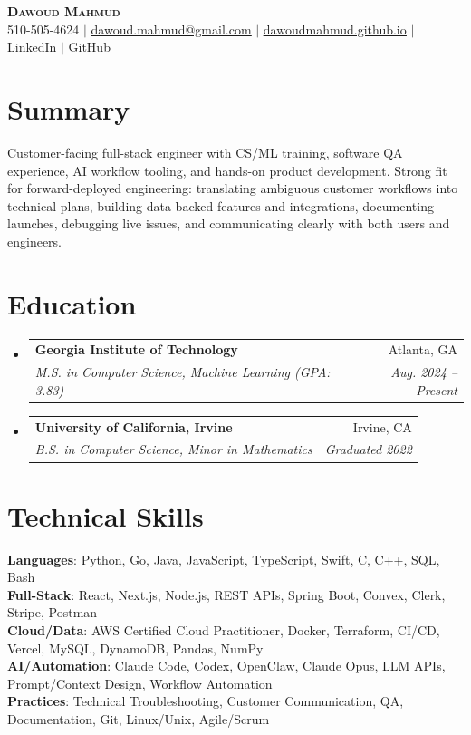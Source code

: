 \documentclass[letterpaper,11pt]{article}
\makeatletter
\newcommand{\resumeSubheading}[4]{
 \vspace{-1pt}\item
 \begin{tabular*}{0.97\textwidth}[t]{l@{\extracolsep{\fill}}r}
 \textbf{#1} & #2 \\
 \textit{\small#3} & \textit{\small #4} \\
 \end{tabular*}\vspace{-6pt}
}
\newcommand{\resumeSubHeadingListStart}{\begin{itemize}[leftmargin=0.15in, label={}]}
\newcommand{\resumeSubHeadingListEnd}{\end{itemize}}
\makeatother
\begin{document}
\begin{center}
 \textbf{\Huge \scshape Dawoud Mahmud} \\ \vspace{1pt}
 \small 510-505-4624 $|$ \href{mailto:dawoud.mahmud@gmail.com}{\underline{dawoud.mahmud@gmail.com}} $|$
 \href{https://dawoudmahmud.github.io}{\underline{dawoudmahmud.github.io}} $|$
 \href{https://linkedin.com/in/dawoud-mahmud}{\underline{LinkedIn}} $|$
 \href{https://github.com/DawoudMahmud}{\underline{GitHub}}
\end{center}

\section{Summary}
 \begin{itemize}[leftmargin=0.15in, label={}]
 \small{\item{
Customer-facing full-stack engineer with CS/ML training, software QA experience, AI workflow tooling, and hands-on product development. Strong fit for forward-deployed engineering: translating ambiguous customer workflows into technical plans, building data-backed features and integrations, documenting launches, debugging live issues, and communicating clearly with both users and engineers.
 }}
 \end{itemize}

\section{Education}
 \resumeSubHeadingListStart
 \resumeSubheading
 {Georgia Institute of Technology}{Atlanta, GA}
 {M.S. in Computer Science, Machine Learning (GPA: 3.83)}{Aug. 2024 -- Present}
 \resumeSubheading
 {University of California, Irvine}{Irvine, CA}
 {B.S. in Computer Science, Minor in Mathematics}{Graduated 2022}
 \resumeSubHeadingListEnd

\section{Technical Skills}
 \begin{itemize}[leftmargin=0.15in, label={}]
 \small{\item{
 \textbf{Languages}{: Python, Go, Java, JavaScript, TypeScript, Swift, C, C++, SQL, Bash} \\
 \textbf{Full-Stack}{: React, Next.js, Node.js, REST APIs, Spring Boot, Convex, Clerk, Stripe, Postman} \\
 \textbf{Cloud/Data}{: AWS Certified Cloud Practitioner, Docker, Terraform, CI/CD, Vercel, MySQL, DynamoDB, Pandas, NumPy} \\
 \textbf{AI/Automation}{: Claude Code, Codex, OpenClaw, Claude Opus, LLM APIs, Prompt/Context Design, Workflow Automation} \\
 \textbf{Practices}{: Technical Troubleshooting, Customer Communication, QA, Documentation, Git, Linux/Unix, Agile/Scrum}
 }}
 \end{itemize}
\end{document}
